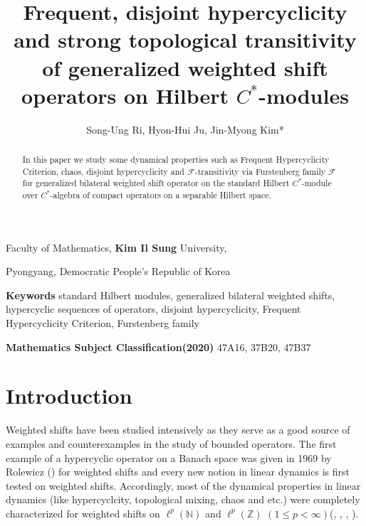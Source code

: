 \documentclass{article}
\title{Frequent, disjoint hypercyclicity and strong topological transitivity of generalized weighted shift operators on Hilbert $C^{\ast}$-modules}
\author{Song-Ung Ri, Hyon-Hui Ju, Jin-Myong Kim*}
\date{}
\begin{document}
\maketitle
{\makeatletter\renewcommand*\@makefnmark{}\makeatother}

\centerline{Faculty of Mathematics, {\bf Kim Il Sung} University,}

\centerline{Pyongyang, Democratic People's Republic of Korea}

\begin{abstract}
In this paper we study some dynamical properties such as Frequent Hypercyclicity Criterion, chaos, disjoint hypercyclicity and $\mathcal{F}$-transitivity via Furstenberg family $\mathcal{F}$ for generalized bilateral weighted shift operator on the standard Hilbert $C^{\ast}$-module over $C^{\ast}$-algebra of compact operators on a separable Hilbert space.

\end{abstract}


\vskip0.6cm\noindent
{\bf Keywords} standard Hilbert modules, generalized bilateral weighted shifts, hypercyclic sequences of operators, disjoint hypercyclicity, 
 Frequent Hypercyclicity Criterion, Furstenberg family

\vskip0.6cm\noindent
{\bf Mathematics Subject Classification(2020)}  47A16, 37B20, 47B37

\section{Introduction}

Weighted shifts have been studied intensively as they serve as a good source of examples and counterexamples in the study of bounded
operators. The first example of a hypercyclic operator on a Banach space was given in 1969 by Rolewicz (\cite{R69}) for weighted shifts and every new notion in linear dynamics is first tested on weighted shifts.  Accordingly, most of the dynamical properties in linear dynamics (like hypercyclcity, topological mixing, chaos and etc.) were completely characterized for weighted shifts on  $\ell^{p}(\mathbb{N})$ and $\ell^{p}(\mathbb{Z})$ $(1\leq p< \infty)$(\cite{BMPP19}, \cite{CS04}, \cite{G00}, \cite{S95}).
\end{document}
